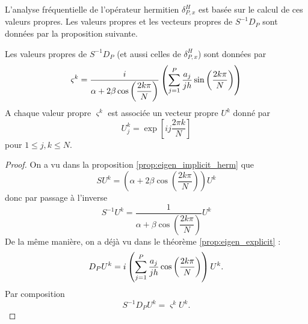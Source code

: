 L'analyse fréquentielle de l'opérateur hermitien $\delta_{P,x}^H$ est basée sur le calcul de ces valeurs propres. Les valeurs propres et les vecteurs propres de $S^{-1} D_P$ sont données par la proposition suivante.

\begin{theoreme}
Les valeurs propres de $S^{-1} D_P$ (et aussi celles de $\delta_{P,x}^H$) sont données par 
\begin{equation}
\varsigma^k = \dfrac{i}{\alpha + 2 \beta \cos \left( \dfrac{2 k \pi}{N} \right)} \left( \displaystyle\sum\limits_{j=1}^P \dfrac{a_j}{jh} \sin \left( \dfrac{2 k \pi}{N} \right) \right)
\end{equation}
A chaque valeur propre $\varsigma^k$ est associée un vecteur propre $U^k$ donné par 
\begin{equation}
U^k_j = \exp \left[ ij \dfrac{2 \pi k}{N} \right]
\end{equation}
pour $1 \leq j,k \leq N$.
\end{theoreme}

\begin{proof}
On a vu dans la proposition \ref{prop:eigen_implicit_herm} que 
\begin{equation}
S U^k = \left( \alpha + 2\beta \cos \left( \dfrac{2 k \pi}{N} \right) \right) U^k
\end{equation}
donc par passage à l'inverse
\begin{equation}
S^{-1} U^k = \dfrac{1}{\alpha + \beta \cos \left( \dfrac{2 k \pi}{N} \right)} U^k
\end{equation}
De la même manière, on a déjà vu dans le théorème \ref{prop:eigen_explicit} : 
\begin{equation}
D_P U^k = i \left( \displaystyle\sum\limits_{j=1}^P \dfrac{a_j}{jh} \cos \left( \dfrac{2 k \pi}{N} \right) \right) U^k.
\end{equation}
Par composition
\begin{equation}
S^{-1} D_P U^k = \varsigma^k U^k.
\end{equation}
\end{proof}

